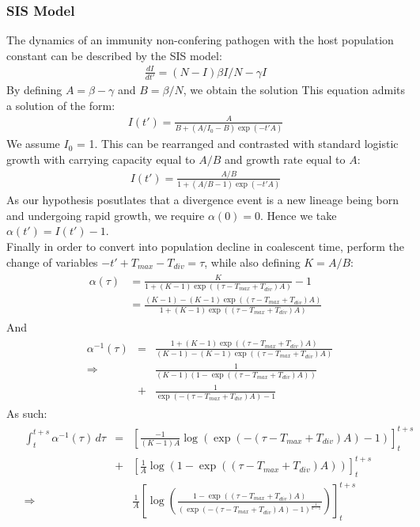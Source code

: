 \documentclass{report}
\theoremstyle{definition}
\begin{document}
\subsubsection{SIS Model}
The dynamics of an immunity non-confering pathogen with the host population constant can be described by the SIS model\cite{keeling_introduction_2008}:
\begin{gather}
\frac{dI}{dt'} = (N-I)\beta I/N -\gamma I
\end{gather}
By defining $A=\beta-\gamma$ and $B=\beta/N$, we obtain the solution 
This equation admits a solution of the form:
\begin{gather}
I(t') = \frac{A}{B+(A/I_0-B)\exp(-t'A)}
\end{gather}
We assume $I_0$ = 1.
This can be rearranged and contrasted with standard logistic growth with carrying capacity equal to $A/B$ and growth rate equal to $A$: 
\begin{gather}
I(t') = \frac{A/B}{1+(A/B - 1)\exp(-t'A)}
\end{gather}
As our hypothesis posutlates that a divergence event is a new lineage being born and undergoing rapid growth, we require $\alpha(0) = 0$. Hence we take $\alpha(t') = I(t')-1$.\\
Finally in order to convert into population decline in coalescent time, perform the change of variables $-t'+T_{max} - T_{div} = \tau$, while also defining $K=A/B$:
\begin{gather}
\begin{aligned}
  \alpha(\tau) &= \frac{K}{1+(K - 1)\exp((\tau-T_{max}+T_{div})A)}-1\\
               &= \frac{(K-1)- (K - 1)\exp((\tau-T_{max}+T_{div})A)}{1+(K - 1)\exp((\tau-T_{max}+T_{div})A)}
\end{aligned}
\end{gather}
And
\begin{gather}
\begin{aligned}
&\alpha^{-1}(\tau) &=&  \frac{1+(K - 1)\exp((\tau-T_{max}+T_{div})A)}{(K-1)- (K - 1)\exp((\tau-T_{max}+T_{div})A)}\\
&\Rightarrow&& \frac{1}{(K-1)(1-\exp((\tau-T_{max}+T_{div})A))}\\
&&+& \frac{1}{\exp(-(\tau-T_{max}+T_{div})A)-1}
\end{aligned}
\end{gather}
As such:
\begin{gather}
\begin{aligned}
&\int_t^{t+s}{\alpha^{-1}(\tau)\,d\tau}&=& \left[\frac{-1}{(K-1)A}\log(\exp(-(\tau-T_{max}+T_{div})A)-1)\right]_t^{t+s}\\
&&+&\left[\frac{1}{A}\log(1-\exp((\tau-T_{max}+T_{div})A))\right]_t^{t+s}\\
&\Rightarrow&&\frac{1}{A}\left[\log(\frac{1-\exp((\tau-T_{max}+T_{div})A)}{(\exp(-(\tau-T_{max}+T_{div})A)-1)^{\frac{1}{k-1}}})\right]_t^{t+s}
\end{aligned}
\end{gather}
\end{document}
